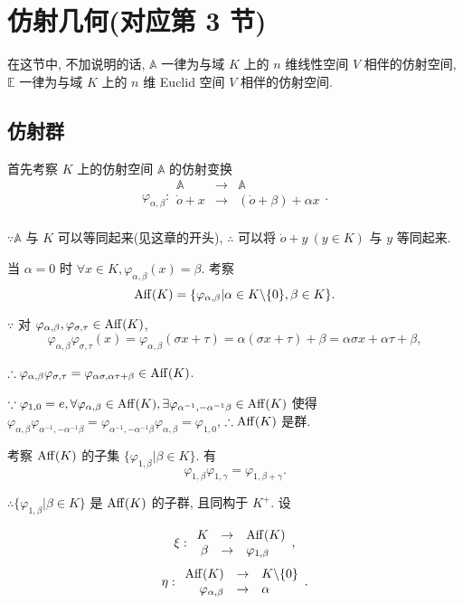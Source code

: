 \documentclass{ctexart}
\begin{document}
\section{仿射几何(对应第 3 节)}
在这节中, 不加说明的话, $\mathbb{A}$ 一律为与域 $K$ 上的 $n$ 维线性空间 $V$ 相伴的仿射空间, $\mathbb{E}$ 一律为与域 $K$ 上的 $n$ 维 Euclid 空间 $V$ 相伴的仿射空间.
\subsection{仿射群}
首先考察 $K$ 上的仿射空间 $\mathbb{A}$ 的仿射变换
\[\varphi_{\alpha,\beta}:\begin{array}{rcl}
    \mathbb{A} & \to & \mathbb{A} \\
    \dot{o}+x & \to & (\dot{o}+\beta)+\alpha x \\
\end{array}.\]

$\because\mathbb{A}$ 与 $K$ 可以等同起来(见这章的开头), $\therefore$ 可以将 $\dot{o}+y\ (y\in K)$ 与 $y$ 等同起来.

当 $\alpha=0$ 时 $\forall x\in K,\varphi_{\alpha,\beta}(x)=\beta$. 考察
\[\operatorname{Aff} (K)=\{\varphi_{\alpha,\beta}|\alpha\in K\backslash\{0\},\beta\in K\}.\]

$\because$ 对 $\varphi_{\alpha,\beta},\varphi_{\sigma,\tau}\in\operatorname{Aff} (K)$,
\[\varphi_{\alpha,\beta}\varphi_{\sigma,\tau}(x)=\varphi_{\alpha,\beta}(\sigma x+\tau)=\alpha(\sigma x+\tau)+\beta=\alpha\sigma x+\alpha\tau+\beta,\]

$\therefore\varphi_{\alpha,\beta}\varphi_{\sigma,\tau}=\varphi_{\alpha\sigma,\alpha\tau+\beta}\in\operatorname{Aff} (K)$.

$\because\varphi_{1,0}=e,\forall\varphi_{\alpha,\beta}\in\operatorname{Aff} (K),\exists\varphi_{\alpha^{-1},-\alpha^{-1}\beta}\in\operatorname{Aff} (K)$ 使得 $\varphi_{\alpha,\beta}\varphi_{\alpha^{-1},-\alpha^{-1}\beta}=\varphi_{\alpha^{-1},-\alpha^{-1}\beta}\varphi_{\alpha,\beta}=\varphi_{1,0}$, $\therefore\operatorname{Aff} (K)$ 是群.

考察 $\operatorname{Aff} (K)$ 的子集 $\{\varphi_{1,\beta}|\beta\in K\}$. 有
\[\varphi_{1,\beta}\varphi_{1,\gamma}=\varphi_{1,\beta+\gamma}.\]

$\therefore\{\varphi_{1,\beta}|\beta\in K\}$ 是 $\operatorname{Aff} (K)$ 的子群, 且同构于 $K^+$. 设

\[\xi:\begin{array}{rcl}
    K & \to & \operatorname{Aff} (K) \\
    \beta & \to & \varphi_{1,\beta} \\
\end{array},\]
\[\eta:\begin{array}{rcl}
    \operatorname{Aff} (K) & \to & K\backslash\{0\} \\
    \varphi_{\alpha,\beta} & \to & \alpha \\
\end{array}.\]
\end{document}

